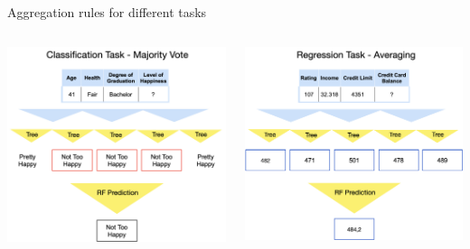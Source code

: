 \documentclass[11pt,compress,t,notes=noshow, xcolor=table]{beamer}
\begin{document}
\begin{vbframe}{Aggregation rules for different tasks}
\begin{columns}  
\begin{column}{0.5\textwidth} 
\begin{center}
 \includegraphics[width = 1\textwidth]{figure_man/nutshell-randomforest-aggregation-classif.png}
 \end{center}
\end{column}
\begin{column}{0.5\textwidth} 
\begin{center}
  \includegraphics[width = 1\textwidth]{figure_man/nutshell-randomforest-aggregation-regression.png}
\end{center}
\end{column}
\end{columns}




\end{vbframe}
\end{document}
